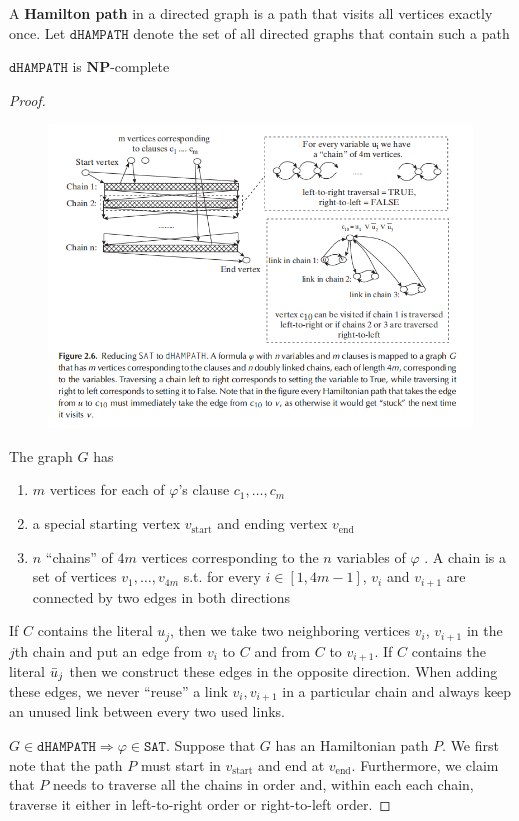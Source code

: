 \documentclass[11pt]{article}
\def \NP {\textbf{NP}}
\def \SAT {\text{SAT}}
\def \start {\text{start}}
\def \tend {\text{end}}
\def \NP {\textbf{NP}}
\def \SAT {\texttt{SAT}}
\def \dHAMPATH {\texttt{dHAMPATH}}
\begin{document}
A \textbf{Hamilton path} in a directed graph is a path that visits all vertices exactly once. Let
\(\dHAMPATH\) denote the set of all directed graphs that contain such a path
\begin{theorem}[]
\(\dHAMPATH\) is \(\NP\)-complete
\end{theorem}

\begin{proof}
\begin{figure}[htbp]
\centering
\includegraphics[width=.9\linewidth]{../images/ComputationalComplexity/8.png}
\end{figure}

The graph \(G\) has
\begin{enumerate}
\item \(m\) vertices for each of \(\varphi\)'s clause \(c_1,\dots,c_m\)
\item a special starting vertex \(v_{\start}\) and ending vertex \(v_{\tend}\)
\item \(n\) ``chains'' of \(4m\) vertices corresponding to the \(n\) variables of \(\varphi\) . A chain is a
set of vertices \(v_1,\dots,v_{4m}\) s.t. for every \(i\in[1,4m-1]\), \(v_i\)
and \(v_{i+1}\) are connected by two edges in both directions
\end{enumerate}


If \(C\) contains the literal \(u_j\), then we take two neighboring
vertices \(v_i\), \(v_{i+1}\) in the \(j\)th chain and put an edge from \(v_i\) to \(C\) and
from \(C\) to \(v_{i+1}\). If \(C\) contains the literal \(\bar{u}_j\) then we construct these
edges in the opposite direction. When adding these edges, we never ``reuse'' a
link \(v_i, v_{i+1}\) in a particular chain and always keep an unused link between every two
used links.


\(G\in\dHAMPATH\Rightarrow\varphi\in\SAT\). Suppose that \(G\) has an Hamiltonian path \(P\).
We first note that the path \(P\) must start in \(v_{\start}\) and end at \(v_{\tend}\).
Furthermore, we claim that \(P\) needs to traverse all the chains in order and, within each
each chain, traverse it either in left-to-right order or right-to-left order.
\end{proof}
\end{document}
